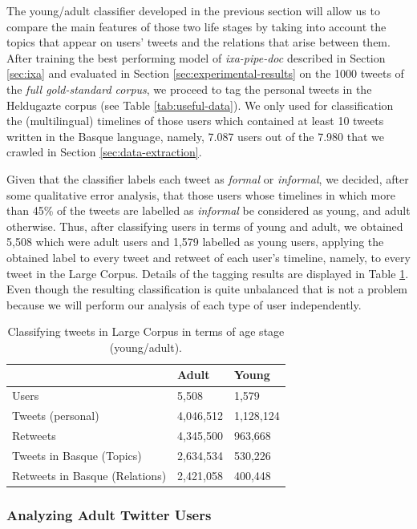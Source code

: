 \documentclass[information,article,submit,moreauthors,pdftex,10pt,a4paper]{Definitions/mdpi}
\begin{document}
The young/adult classifier developed in the previous section will allow us to compare the main features of those two life stages by taking into account the topics that appear on users' tweets and the relations that arise between them. After training the best performing model of \emph{ixa-pipe-doc} described in Section \ref{sec:ixa} and evaluated in Section \ref{sec:experimental-results} on the 1000 tweets of the \emph{full gold-standard corpus}, we proceed to tag the personal tweets in the Heldugazte corpus (see Table \ref{tab:useful-data}). We only used for classification the (multilingual) timelines of those users which contained at least 10 tweets written in the Basque language, namely, 7.087 users out of the 7.980 that we crawled in Section \ref{sec:data-extraction}.

Given that the classifier labels each tweet as \emph{formal} or \emph{informal}, we decided, after some qualitative error analysis, that those users whose timelines in which more than 45\% of the tweets are labelled as \emph{informal} be considered as young, and adult otherwise. Thus, after classifying users in terms of young and adult, we obtained 5,508 which were adult users and 1,579 labelled as young users, applying the obtained label to every tweet and retweet of each user's timeline, namely, to every tweet in the Large Corpus. Details of the tagging results are displayed in Table \ref{tab:largecorpusdata}. Even though the resulting classification is quite unbalanced that is not a problem because we will perform our analysis of each type of user independently.

\begin{table}[H]
  \centering
  \begin{tabular}{lll} \hline
     & Adult & Young \\ \hline \hline
    Users & 5,508 & 1,579 \\
    Tweets (personal) & 4,046,512 & 1,128,124 \\
    Retweets  & 4,345,500 & 963,668 \\
    Tweets in Basque (Topics) & 2,634,534 & 530,226 \\
    Retweets in Basque (Relations) & 2,421,058 & 400,448 \\ \hline
  \end{tabular}
  \caption{Classifying tweets in Large Corpus in terms of age stage (young/adult).}
  \label{tab:largecorpusdata}
\end{table}


\subsubsection{Analyzing Adult Twitter Users}
\end{document}
